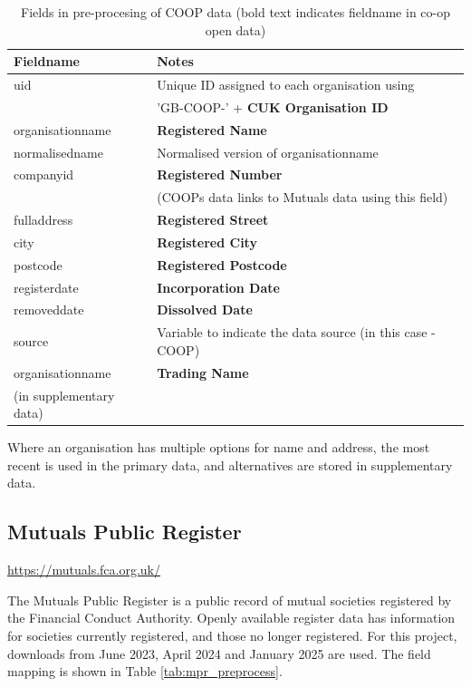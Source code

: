 \documentclass{article}
\begin{document}
\begin{table}[h]
  \centering
  \begin{tabularx}{\textwidth}{|l|X|}
    \hline
    Fieldname  &	Notes \\
    \hline \hline
uid & Unique ID assigned to each organisation using \\
&'GB-COOP-' + \textbf{CUK Organisation ID} \\ \hline
organisationname & \textbf{Registered Name} \\ \hline
normalisedname & Normalised version of organisationname\\ \hline
companyid & \textbf{Registered Number} \\
&(COOPs data links to Mutuals data using this field) \\ \hline
fulladdress & \textbf{Registered Street} \\ \hline
city & \textbf{Registered City} \\ \hline
postcode & \textbf{Registered Postcode} \\ \hline
registerdate & \textbf{Incorporation Date} \\ \hline
removeddate & \textbf{Dissolved Date} \\ \hline
source & Variable to indicate the data source (in this case - COOP) \\ \hline
\hline \hline
organisationname & \textbf{Trading Name} \\
(in supplementary data) & \\ \hline
\end{tabularx}
  \caption{Fields in pre-procesing of COOP data (bold text indicates fieldname in co-op open data)}
  \label{tab:coop_preprocess}
  
\end{table}

Where an organisation has multiple options for name and address, the most recent
is used in the primary data, and alternatives are stored in supplementary data.


\clearpage
\subsection{Mutuals Public Register }
\url{https://mutuals.fca.org.uk/}

The Mutuals Public Register is a public record of mutual societies registered by the Financial Conduct Authority. 
Openly available register data has information for societies currently registered, and those no longer registered.
For this project, downloads from June 2023, April 2024 and January 2025 are used. The field mapping is shown in Table 
\ref{tab:mpr_preprocess}. 
\end{document}
